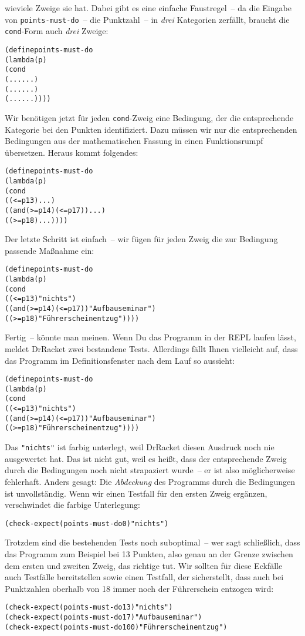 wieviele Zweige sie hat.  Dabei gibt es eine einfache Faustregel~-- da
die Eingabe von \texttt{points-must-do}~-- die Punktzahl~-- in
\emph{drei} Kategorien zerfällt, braucht die \texttt{cond}-Form auch
\emph{drei} Zweige:
%
\begin{alltt}
(define points-must-do
  (lambda (p)
    (cond
      (... ...)
      (... ...)
      (... ...))))
\end{alltt}
%
Wir benötigen jetzt für jeden \texttt{cond}-Zweig eine Bedingung, der die
entsprechende Kategorie bei den Punkten identifiziert.  Dazu müssen
wir nur die entsprechenden Bedingungen aus der mathematischen Fassung
in einen Funktionsrumpf übersetzen.  Heraus kommt folgendes:
%
\begin{alltt}
(define points-must-do
  (lambda (p)
    (cond
      ((<= p 13) ...)
      ((and (>= p 14) (<= p 17)) ...)
      ((>= p 18) ...))))
\end{alltt}
%
Der letzte Schritt ist einfach~-- wir fügen für jeden Zweig die zur
Bedingung passende Maßnahme ein:
%
\begin{alltt}
(define points-must-do
  (lambda (p)
    (cond
      ((<= p 13) "nichts")
      ((and (>= p 14) (<= p 17)) "Aufbauseminar")
      ((>= p 18) "Führerscheinentzug"))))
\end{alltt}
%
Fertig~-- könnte man meinen.  Wenn Du das Programm in der REPL laufen lässt,
meldet DrRacket zwei bestandene Tests.  Allerdings fällt Ihnen
vielleicht auf, dass das Programm im Definitionsfenster nach dem Lauf
so aussieht:
%
\begin{alltt}
(define points-must-do
  (lambda (p)
    (cond
      ((<= p 13) \colorbox{featuregray}{"nichts"})
      ((and (>= p 14) (<= p 17)) "Aufbauseminar")
      ((>= p 18) "Führerscheinentzug"))))
\end{alltt}
%
Das \verb|"nichts"| ist farbig unterlegt, weil DrRacket diesen
Ausdruck noch nie ausgewertet hat.  Das ist nicht gut, weil es heißt,
dass der entsprechende Zweig durch die Bedingungen noch nicht strapaziert
wurde~-- er ist also möglicherweise fehlerhaft.  Anders gesagt: Die
\textit{Abdeckung} des Programms durch die Bedingungen ist
unvollständig.  Wenn wir einen Testfall für den ersten Zweig ergänzen,
verschwindet die farbige Unterlegung:
%
\begin{alltt}
(check-expect (points-must-do 0) "nichts")
\end{alltt}
%
Trotzdem sind die bestehenden Tests noch suboptimal~-- wer sagt
schließlich, dass das Programm zum Beispiel bei 13 Punkten, also genau
an der Grenze zwischen dem ersten und zweiten Zweig, das richtige tut.
Wir sollten für diese Eckfälle auch Testfälle
bereitstellen sowie einen Testfall, der sicherstellt, dass auch bei
Punktzahlen oberhalb von 18 immer noch der Führerschein entzogen wird:
%
\begin{alltt}
(check-expect (points-must-do 13) "nichts")
(check-expect (points-must-do 17) "Aufbauseminar")
(check-expect (points-must-do 100) "Führerscheinentzug")
\end{alltt}

